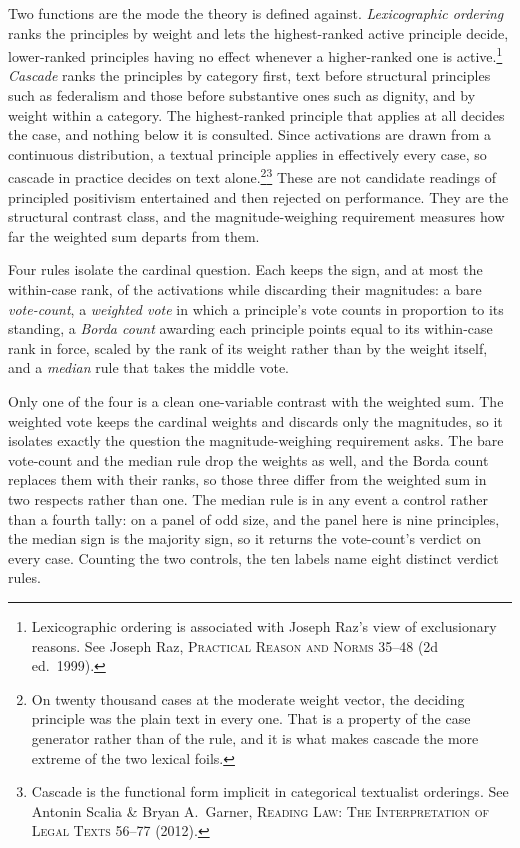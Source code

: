 Two functions are the mode the theory is defined against. \textit{Lexicographic
ordering} ranks the principles by weight and lets the highest-ranked active
principle decide, lower-ranked principles having no effect whenever a
higher-ranked one is active.\footnote{Lexicographic ordering is associated
with Joseph Raz's view of exclusionary reasons. See Joseph Raz,
\textsc{Practical Reason and Norms} 35--48 (2d ed.\ 1999).}
\textit{Cascade} ranks the principles by category first, text before
structural principles such as federalism and those before substantive ones
such as dignity, and by weight within a category. The highest-ranked principle
that applies at all decides the case, and nothing below it is consulted. Since
activations are drawn from a continuous distribution, a textual principle
applies in effectively every case, so cascade in practice decides on text
alone.\footnote{On twenty thousand cases at the moderate weight vector, the
deciding principle was the plain text in every one. That is a property of the
case generator rather than of the rule, and it is what makes cascade the more
extreme of the two lexical foils.}\footnote{Cascade is the functional form
implicit in categorical textualist orderings. See Antonin Scalia \& Bryan
A.\ Garner, \textsc{Reading Law: The Interpretation of Legal Texts} 56--77
(2012).} These are not candidate readings of principled positivism
entertained and then rejected on performance. They are the structural
contrast class, and the magnitude-weighing requirement measures how far the
weighted sum departs from them.

Four rules isolate the cardinal question. Each keeps the sign, and at most the
within-case rank, of the activations while discarding their magnitudes: a bare
\textit{vote-count}, a \textit{weighted vote} in which a principle's vote
counts in proportion to its standing, a \textit{Borda count} awarding each
principle points equal to its within-case rank in force, scaled by the rank of
its weight rather than by the weight itself, and a \textit{median} rule that
takes the middle vote.

Only one of the four is a clean one-variable contrast with the weighted sum.
The weighted vote keeps the cardinal weights and discards only the magnitudes,
so it isolates exactly the question the magnitude-weighing requirement asks. The
bare vote-count and the median rule drop the weights as well, and the Borda
count replaces them with their ranks, so those three differ from the weighted
sum in two respects rather than one. The median rule is in any event a control
rather than a fourth tally: on a panel of odd size, and the panel here is nine
principles, the median sign is the majority sign, so it returns the
vote-count's verdict on every case. Counting the two controls, the ten labels
name eight distinct verdict rules.

